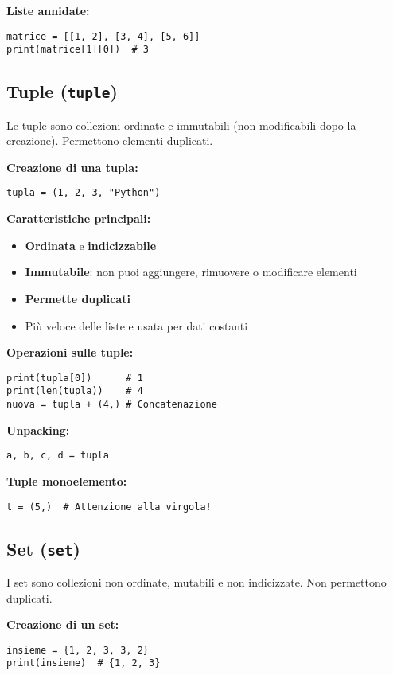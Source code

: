 \documentclass[a4paper,12pt]{article}
\begin{document}
\textbf{Liste annidate:}
\begin{lstlisting}
matrice = [[1, 2], [3, 4], [5, 6]]
print(matrice[1][0])  # 3
\end{lstlisting}

\subsection*{Tuple (\texttt{tuple})}
Le tuple sono collezioni ordinate e immutabili (non modificabili dopo la creazione). Permettono elementi duplicati.

\textbf{Creazione di una tupla:}
\begin{lstlisting}
tupla = (1, 2, 3, "Python")
\end{lstlisting}

\textbf{Caratteristiche principali:}
\begin{itemize}
    \item \textbf{Ordinata} e \textbf{indicizzabile}
    \item \textbf{Immutabile}: non puoi aggiungere, rimuovere o modificare elementi
    \item \textbf{Permette duplicati}
    \item Più veloce delle liste e usata per dati costanti
\end{itemize}

\textbf{Operazioni sulle tuple:}
\begin{lstlisting}
print(tupla[0])      # 1
print(len(tupla))    # 4
nuova = tupla + (4,) # Concatenazione
\end{lstlisting}

\textbf{Unpacking:}
\begin{lstlisting}
a, b, c, d = tupla
\end{lstlisting}

\textbf{Tuple monoelemento:}
\begin{lstlisting}
t = (5,)  # Attenzione alla virgola!
\end{lstlisting}

\subsection*{Set (\texttt{set})}
I set sono collezioni non ordinate, mutabili e non indicizzate. Non permettono duplicati.

\textbf{Creazione di un set:}
\begin{lstlisting}
insieme = {1, 2, 3, 3, 2}
print(insieme)  # {1, 2, 3}
\end{lstlisting}
\end{document}
